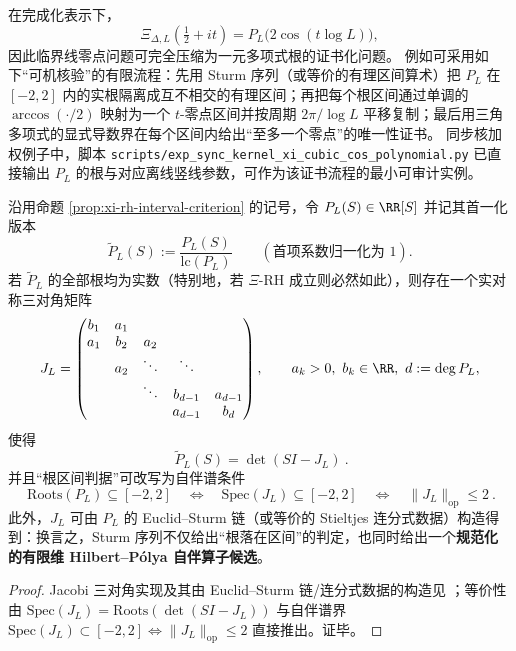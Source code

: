 \begin{remark}\label{rem:xi-hard-zero-certificate}
在完成化表示下，
\[
\Xi_{\Delta,L}\!\left(\tfrac12+it\right)=P_L\!\bigl(2\cos(t\log L)\bigr),
\]
因此临界线零点问题可完全压缩为一元多项式根的证书化问题。
例如可采用如下“可机核验”的有限流程：先用 Sturm 序列（或等价的有理区间算术）把 \(P_L\) 在 \([-2,2]\) 内的实根隔离成互不相交的有理区间；再把每个根区间通过单调的 \(\arccos(\cdot/2)\) 映射为一个 \(t\)-零点区间并按周期 \(2\pi/\log L\) 平移复制；最后用三角多项式的显式导数界在每个区间内给出“至多一个零点”的唯一性证书。
同步核加权例子中，脚本 \texttt{scripts/exp\_sync\_kernel\_xi\_cubic\_cos\_polynomial.py} 已直接输出 \(P_L\) 的根与对应离线竖线参数，可作为该证书流程的最小可审计实例。
\end{remark}

\begin{proposition}\label{prop:xi-hilbert-polya-jacobi}
沿用命题 \ref{prop:xi-rh-interval-criterion} 的记号，令 \(P_L(S)\in\RR[S]\) 并记其首一化版本
\[
\widetilde P_L(S):=\frac{P_L(S)}{\mathrm{lc}(P_L)}\qquad(\text{首项系数归一化为 }1).
\]
若 \(\widetilde P_L\) 的全部根均为实数（特别地，若 \(\Xi\)-RH 成立则必然如此），则存在一个实对称三对角矩阵
\[
J_L=\begin{pmatrix}
b_1 & a_1 \\
a_1 & b_2 & a_2\\
& a_2 & \ddots & \ddots\\
& & \ddots & b_{d-1} & a_{d-1}\\
& & & a_{d-1} & b_d
\end{pmatrix},\qquad a_k>0,\ b_k\in\RR,\ d:=\deg P_L,
\]
使得
\[
\boxed{\ \widetilde P_L(S)=\det(SI-J_L)\ }.
\]
并且“根区间判据”可改写为自伴谱条件
\[
\boxed{\ \mathrm{Roots}(P_L)\subseteq[-2,2]\quad\Longleftrightarrow\quad \mathrm{Spec}(J_L)\subseteq[-2,2]\quad\Longleftrightarrow\quad \|J_L\|_{\mathrm{op}}\le 2\ }.
\]
此外，\(J_L\) 可由 \(P_L\) 的 Euclid--Sturm 链（或等价的 Stieltjes 连分式数据）构造得到：换言之，Sturm 序列不仅给出“根落在区间”的判定，也同时给出一个\textbf{规范化的有限维 Hilbert--P{\'o}lya 自伴算子候选}。
\end{proposition}
\begin{proof}
Jacobi 三对角实现及其由 Euclid--Sturm 链/连分式数据的构造见 \cite{Fiedler1990SymmetricCharpoly,Schmeisser1993TridiagonalGivenCharpoly}；等价性由 \(\mathrm{Spec}(J_L)=\mathrm{Roots}(\det(SI-J_L))\) 与自伴谱界 \(\mathrm{Spec}(J_L)\subset[-2,2]\iff \|J_L\|_{\mathrm{op}}\le 2\) 直接推出。证毕。
\end{proof}

